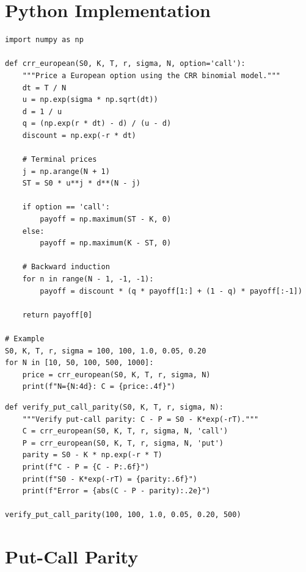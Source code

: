 \section{Python Implementation}

\begin{codeblock}[title=\textbf{CRR Binomial Model in Python}]
\begin{verbatim}
import numpy as np

def crr_european(S0, K, T, r, sigma, N, option='call'):
    """Price a European option using the CRR binomial model."""
    dt = T / N
    u = np.exp(sigma * np.sqrt(dt))
    d = 1 / u
    q = (np.exp(r * dt) - d) / (u - d)
    discount = np.exp(-r * dt)

    # Terminal prices
    j = np.arange(N + 1)
    ST = S0 * u**j * d**(N - j)

    if option == 'call':
        payoff = np.maximum(ST - K, 0)
    else:
        payoff = np.maximum(K - ST, 0)

    # Backward induction
    for n in range(N - 1, -1, -1):
        payoff = discount * (q * payoff[1:] + (1 - q) * payoff[:-1])

    return payoff[0]

# Example
S0, K, T, r, sigma = 100, 100, 1.0, 0.05, 0.20
for N in [10, 50, 100, 500, 1000]:
    price = crr_european(S0, K, T, r, sigma, N)
    print(f"N={N:4d}: C = {price:.4f}")
\end{verbatim}
\end{codeblock}

\begin{codeblock}[title=\textbf{Put-Call Parity --- Verification}]
\begin{verbatim}
def verify_put_call_parity(S0, K, T, r, sigma, N):
    """Verify put-call parity: C - P = S0 - K*exp(-rT)."""
    C = crr_european(S0, K, T, r, sigma, N, 'call')
    P = crr_european(S0, K, T, r, sigma, N, 'put')
    parity = S0 - K * np.exp(-r * T)
    print(f"C - P = {C - P:.6f}")
    print(f"S0 - K*exp(-rT) = {parity:.6f}")
    print(f"Error = {abs(C - P - parity):.2e}")

verify_put_call_parity(100, 100, 1.0, 0.05, 0.20, 500)
\end{verbatim}
\end{codeblock}

\section{Put-Call Parity}

